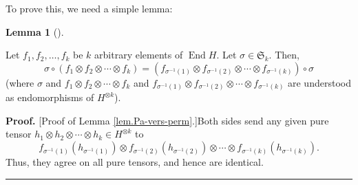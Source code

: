 \documentclass[numbers=enddot,12pt,final,onecolumn,notitlepage]{scrartcl}%
\theoremstyle{definition}
\newtheorem{lem}[theo]{Lemma}
\newenvironment{lemma}[1][]
{\begin{lem}[#1]\begin{leftbar}}
{\end{leftbar}\end{lem}}
\newenvironment{proof}[1][Proof]{\noindent\textbf{#1.} }{\ \rule{0.5em}{0.5em}}
\begin{document}
To prove this, we need a simple lemma:

\begin{lemma}
\label{lem.Pa-vers-perm}Let $f_{1},f_{2},\ldots,f_{k}$ be $k$ arbitrary
elements of $\operatorname*{End}H$. Let $\sigma\in\mathfrak{S}_{k}$. Then,%
\[
\sigma\circ\left(  f_{1}\otimes f_{2}\otimes\cdots\otimes f_{k}\right)
=\left(  f_{\sigma^{-1}\left(  1\right)  }\otimes f_{\sigma^{-1}\left(
2\right)  }\otimes\cdots\otimes f_{\sigma^{-1}\left(  k\right)  }\right)
\circ\sigma
\]
(where $\sigma$ and $f_{1}\otimes f_{2}\otimes\cdots\otimes f_{k}$ and
$f_{\sigma^{-1}\left(  1\right)  }\otimes f_{\sigma^{-1}\left(  2\right)
}\otimes\cdots\otimes f_{\sigma^{-1}\left(  k\right)  }$ are understood as
endomorphisms of $H^{\otimes k}$).
\end{lemma}

\begin{proof}
[Proof of Lemma \ref{lem.Pa-vers-perm}.]Both sides send any given pure tensor
$h_{1}\otimes h_{2}\otimes\cdots\otimes h_{k}\in H^{\otimes k}$ to
\[
f_{\sigma^{-1}\left(  1\right)  }\left(  h_{\sigma^{-1}\left(  1\right)
}\right)  \otimes f_{\sigma^{-1}\left(  2\right)  }\left(  h_{\sigma
^{-1}\left(  2\right)  }\right)  \otimes\cdots\otimes f_{\sigma^{-1}\left(
k\right)  }\left(  h_{\sigma^{-1}\left(  k\right)  }\right)  .
\]
Thus, they agree on all pure tensors, and hence are identical.
\end{proof}
\end{document}
